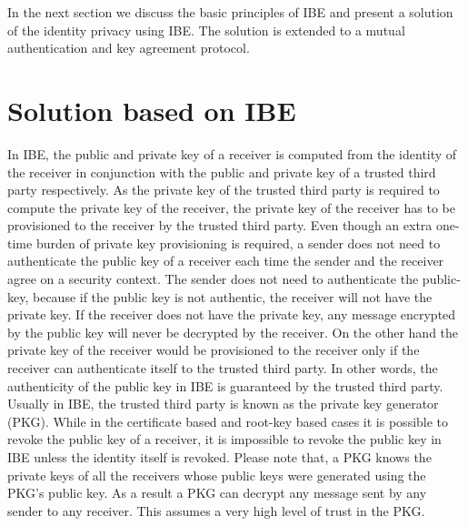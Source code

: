 \documentclass[runningheads,a4paper]{llncs} %
\begin{document}
In the next section we discuss the basic principles of IBE and present a solution of the identity privacy using IBE. The solution is extended to a mutual authentication and key agreement protocol.


\section{Solution based on IBE} 
\label{sec:solutions_based_on_IBE}
In IBE, the public and private key of a receiver is computed from the identity of the receiver in conjunction with the public and private key of a trusted third party respectively. As the private key of the trusted third party is required to compute the private key of the receiver, the private key of the receiver has to be provisioned to the receiver by the trusted third party. Even though an extra one-time burden of private key provisioning is required, a sender does not need to authenticate the public key of a receiver each time the sender and the receiver agree on a security context. The sender does not need to authenticate the public-key, because if the public key is not authentic, the receiver will not have the private key. If the receiver does not have the private key, any message encrypted by the public key will never be decrypted by the receiver. On the other hand the private key of the receiver would be provisioned to the receiver only if the receiver can authenticate itself to the trusted third party. In other words, the authenticity of the public key in IBE is guaranteed by the trusted third party. Usually in IBE, the trusted third party is known as the private key generator (PKG). While in the certificate based and root-key based cases it is possible to revoke the public key of a receiver, it is impossible to revoke the public key in IBE unless the identity itself is revoked. Please note that, a PKG knows the private keys of all the receivers whose public keys were generated using the PKG's public key. As a result a PKG can decrypt any message sent by any sender to any receiver. This assumes a very high level of trust in the PKG.  
\end{document}
